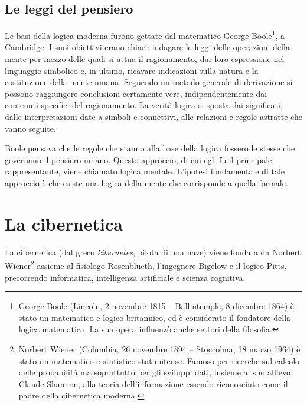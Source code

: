 \subsection{Le leggi del pensiero}
Le basi della logica moderna furono gettate dal matematico George Boole\footnote{George Boole (Lincoln, 2 novembre 1815 – Ballintemple, 8 dicembre 1864) è stato un matematico e logico britannico, ed è considerato il fondatore della logica matematica. La sua opera influenzò anche settori della filosofia.}, a Cambridge. I suoi obiettivi erano chiari: indagare le leggi delle operazioni della mente per mezzo delle quali si attua il ragionamento, dar loro espressione nel linguaggio simbolico e, in ultimo, ricavare indicazioni sulla natura e la costituzione della mente umana. Seguendo un metodo generale di derivazione si possono raggiungere conclusioni certamente vere, indipendentemente dai contenuti specifici del ragionamento. La verità logica si sposta dai significati, dalle interpretazioni date a simboli e connettivi, alle relazioni e regole astratte che vanno seguite.

Boole pensava che le regole che stanno alla base della logica fossero le stesse che governano il pensiero umano. Questo approccio, di cui egli fu il principale rappresentante, viene chiamato logica mentale. L'ipotesi fondamentale di tale approccio è che esiste una logica della mente che corrisponde a quella formale.

\section{La cibernetica}
La cibernetica (dal greco \emph{kibernetes}, pilota di una nave) viene fondata da Norbert Wiener\footnote{Norbert Wiener (Columbia, 26 novembre 1894 – Stoccolma, 18 marzo 1964) è stato un matematico e statistico statunitense. Famoso per ricerche sul calcolo delle probabilità ma soprattutto per gli sviluppi dati, insieme al suo allievo Claude Shannon, alla teoria dell'informazione essendo riconosciuto come il padre della cibernetica moderna.} assieme al fisiologo Rosenblueth, l'ingegnere Bigelow e il logico Pitts, precorrendo informatica, intelligenza artificiale e scienza cognitiva.

